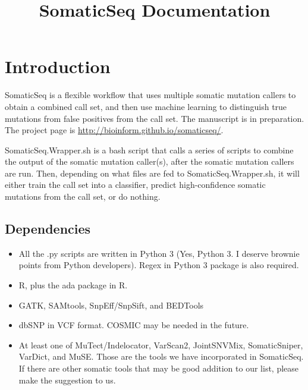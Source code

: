 \documentclass[10pt,letterpaper]{article}
\title{SomaticSeq Documentation}
\begin{document}
\maketitle



\begin{sloppypar}




\section{Introduction}

SomaticSeq is a flexible workflow that uses multiple somatic mutation callers to obtain a combined call set, and then use machine learning to distinguish true mutations from false positives from the call set. The manuscript is in preparation. The project page is \href{http://bioinform.github.io/somaticseq/}{http://bioinform.github.io/somaticseq/}. 

SomaticSeq.Wrapper.sh is a bash script that calls a series of scripts to combine the output of the somatic mutation caller(s), after the somatic mutation callers are run. Then, depending on what files are fed to SomaticSeq.Wrapper.sh, it will either train the call set into a classifier, predict high-confidence somatic mutations from the call set, or do nothing. 

\subsection{Dependencies}

\begin{itemize}

\item
All the .py scripts are written in Python 3 (Yes, Python 3. I deserve brownie points from Python developers). Regex in Python 3 package is also required. 

\item
R, plus the ada package in R.

\item
GATK, SAMtools, SnpEff/SnpSift, and BEDTools

\item
dbSNP in VCF format. COSMIC may be needed in the future.

\item
At least one of MuTect/Indelocator, VarScan2, JointSNVMix, SomaticSniper, VarDict, and MuSE. Those are the tools we have incorporated in SomaticSeq. If there are other somatic tools that may be good addition to our list, please make the suggestion to us. 


\end{itemize}
\end{sloppypar}
\end{document}
